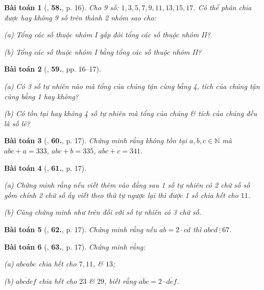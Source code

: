 \documentclass{article}
\numberwithin{equation}{section}
\newtheorem{baitoan}{Bài toán}[section]
\begin{document}
\begin{baitoan}[\cite{Binh_Toan_6_tap_1}, \textbf{58.}, p. 16]
	Cho 9 số: $1,3,5,7,9,11,13,15,17$. Có thể phân chia được hay không 9 số trên thành 2 nhóm sao cho:
	\begin{enumerate*}
		\item[(a)] Tổng các số thuộc nhóm I gấp đôi tổng các số thuộc nhóm II?
		\item[(b)] Tổng các số thuộc nhóm I bằng tổng các số thuộc nhóm II?
	\end{enumerate*}
\end{baitoan}

\begin{baitoan}[\cite{Binh_Toan_6_tap_1}, \textbf{59.}, pp. 16--17]
	\begin{enumerate*}
		\item[(a)] Có 3 số tự nhiên nào mà tổng của chúng tận cùng bằng 4, tích của chúng tận cùng bằng 1 hay không?
		\item[(b)] Có tồn tại hay không 4 số tự nhiên mà tổng của chúng \& tích của chúng đều là số lẻ?
	\end{enumerate*}
\end{baitoan}

\begin{baitoan}[\cite{Binh_Toan_6_tap_1}, \textbf{60.}, p. 17]
	Chứng minh rằng không tồn tại $a,b,c\in\mathbb{N}$ mà $abc + a = 333$, $abc + b = 335$, $abc + c = 341$.
\end{baitoan}

\begin{baitoan}[\cite{Binh_Toan_6_tap_1}, \textbf{61.}, p. 17]
	\begin{enumerate*}
		\item[(a)] Chứng minh rằng nếu viết thêm vào đằng sau 1 số tự nhiên có 2 chữ số số gồm chính 2 chữ số ấy viết theo thứ tự ngược lại thì được 1 số chia hết cho $11$.
		\item[(b)] Cũng chứng minh như trên đối với số tự nhiên có 3 chữ số.
	\end{enumerate*}
\end{baitoan}

\begin{baitoan}[\cite{Binh_Toan_6_tap_1}, \textbf{62.}, p. 17]
	Chứng minh rằng nếu $\overline{ab} = 2\cdot\overline{cd}$ thì $\overline{abcd}\ \vdots\ 67$.
\end{baitoan}

\begin{baitoan}[\cite{Binh_Toan_6_tap_1}, \textbf{63.}, p. 17]
	Chứng minh rằng:
	\begin{enumerate*}
		\item[(a)] $\overline{abcabc}$ chia hết cho $7,11$, \& $13$;
		\item[(b)] $\overline{abcdef}$ chia hết cho $23$ \& $29$, biết rằng $\overline{abc} = 2\cdot\overline{def}$.
	\end{enumerate*}
\end{baitoan}
\end{document}
